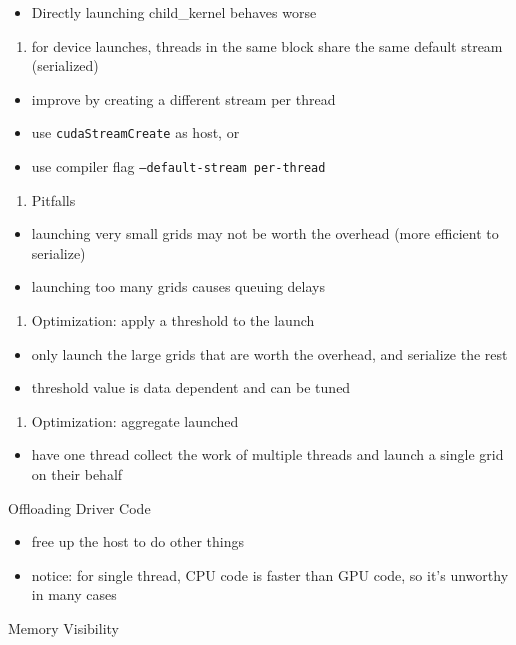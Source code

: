 \documentclass{article}
\begin{document}
\begin{itemize}
\item Directly launching child\_kernel behaves worse
\end{itemize}
\begin{enumerate}
\item for device launches, threads in the same block share the same default stream (serialized)
\end{enumerate}
\begin{itemize}
\item improve by creating a different stream per thread
\item use \texttt{cudaStreamCreate} as host, or
\item use compiler flag \texttt{--default-stream per-thread}
\end{itemize}
\begin{enumerate}
\item Pitfalls
\end{enumerate}
\begin{itemize}
\item launching very small grids may not be worth the overhead (more efficient to serialize)
\item launching too many grids causes queuing delays
\end{itemize}
\begin{enumerate}
\item Optimization: apply a threshold to the launch
\end{enumerate}
\begin{itemize}
\item only launch the large grids that are worth the overhead, and serialize the rest
\item threshold value is data dependent and can be tuned
\end{itemize}
\begin{enumerate}
\item Optimization: aggregate launched
\end{enumerate}
\begin{itemize}
\item have one thread collect the work of multiple threads and launch a single grid on their behalf

\end{itemize}
Offloading Driver Code

\begin{itemize}
\item free up the host to do other things
\item notice: for single thread, CPU code is faster than GPU code, so it's unworthy in many cases

\end{itemize}
Memory Visibility
\end{document}

